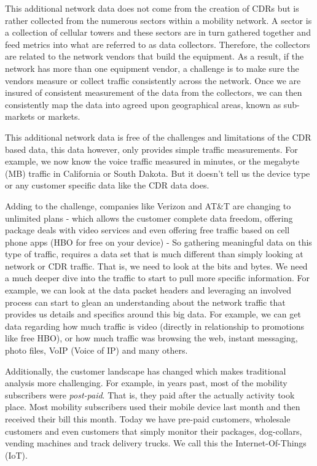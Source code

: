 \documentclass[sigconf]{acmart}
\begin{document}
This additional network data does not come from the creation of CDRs but is rather collected from the numerous sectors within a mobility network.  A sector is a collection of cellular towers and these sectors are in turn gathered together and feed metrics into what are referred to as data collectors.  Therefore, the collectors are related to the network vendors that build the equipment.  As a result, if the network has more than one equipment vendor, a challenge is to make sure the vendors measure or collect traffic consistently across the network.  Once we are insured of consistent measurement of the data from the collectors, we can then consistently map the data into agreed upon geographical areas, known as sub-markets or markets.  

This additional network data is free of the challenges and limitations of the CDR based data, this data however, only provides simple traffic measurements.  For example, we now know the voice traffic measured in minutes, or the megabyte (MB) traffic in California or South Dakota.  But it doesn't tell us the device type or any customer specific data like the CDR data does.  

Adding to the challenge, companies like Verizon and AT\&T are changing to unlimited plans - which allows the customer complete data freedom, offering package deals with video services and even offering free traffic based on cell phone apps (HBO for free on your device) - So gathering meaningful data on this type of traffic, requires a data set that is much different than simply looking at network or CDR traffic. That is, we need to look at the bits and bytes. We need a much deeper dive into the traffic to start to pull more specific information.   For example, we can look at the data packet headers and leveraging an involved process can start to glean an understanding about the network traffic that provides us details and specifics around this big data.  For example, we can get data regarding how much traffic is video (directly in relationship to promotions like free HBO), or how much traffic was browsing the web, instant messaging, photo files, VoIP (Voice of IP) and many others.  

Additionally, the customer landscape has changed which makes traditional analysis more challenging.  For example, in years past, most of the mobility subscribers were {\em post-paid}.   That is, they paid after the actually activity took place.  Most mobility subscribers used their mobile device last month and then received their bill this month.  Today we have pre-paid customers, wholesale customers and even customers that simply monitor their packages, dog-collars, vending machines and track delivery trucks.  We call this the Internet-Of-Things (IoT).  
\end{document}
